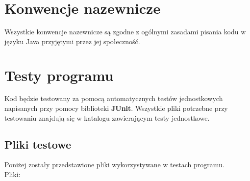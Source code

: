 \documentclass{article}
\begin{document}
\section{Konwencje nazewnicze}
Wszystkie konwencje nazewnicze są zgodne z ogólnymi zasadami pisania kodu w języku Java przyjętymi przez jej społeczność.

\newpage

\section{Testy programu}

Kod będzie testowany za pomocą automatycznych testów jednostkowych napisanych przy pomocy biblioteki \textbf{JUnit}. Wszystkie pliki potrzebne przy testowaniu znajdują się w katalogu zawierającym testy jednostkowe.
\subsection{Pliki testowe}
Poniżej zostały przedstawione pliki wykorzystywane w testach programu.\\
\noindent Pliki:
\end{document}
